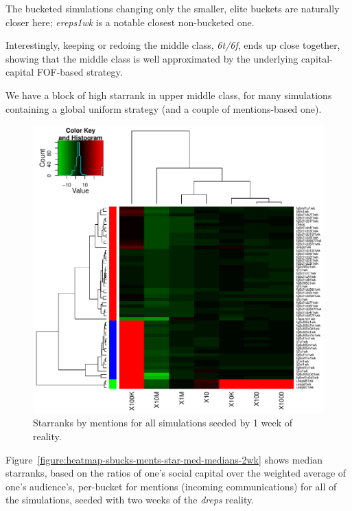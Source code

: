 \documentclass[10pt,oneside]{memoir}
\begin{document}
\begin{Spacing}{2}
The bucketed simulations changing only the smaller, elite buckets are naturally closer here; {\itshape ereps1wk} is a notable closest non-bucketed one.


Interestingly, keeping or redoing the middle class, {\itshape 6t/6f}, ends up close together, showing that the middle class is well approximated by the underlying capital-capital FOF-based strategy.


We have a block of high starrank in upper middle class, for many simulations containing a global uniform strategy (and a couple of mentions-based one).



\begin{figure}
\begin{center}
    \includegraphics{figures/crop/heatmap-sbucks-ments-star-med-medians-1wk}
    \caption{Starranks by mentions for all simulations seeded by 1 week of reality.}
    \label{figure:heatmap-sbucks-ments-star-med-medians-1wk}
\end{center}
\end{figure}
Figure~\ref{figure:heatmap-sbucks-ments-star-med-medians-2wk} shows median starranks, based on the ratios of one's social capital over the weighted average of one's audience's, per-bucket for mentions (incoming communications) for all of the simulations, seeded with two weeks of the {\itshape dreps} reality.



\end{Spacing}
\end{document}
